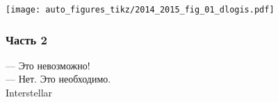 \begin{enumerate}
\begin{minipage}{0.6\textwidth}
\begin{center}
\texttt{[image: auto\_figures\_tikz/2014\_2015\_fig\_01\_dlogis.pdf]}
\end{center}
\end{minipage}
\end{enumerate}


\subsubsection*{Часть 2}

\begin{flushright}
 — Это невозможно! \\
— Нет. Это необходимо.\\
\textcopyright \hspace{0.1cm} Interstellar
\end{flushright}

